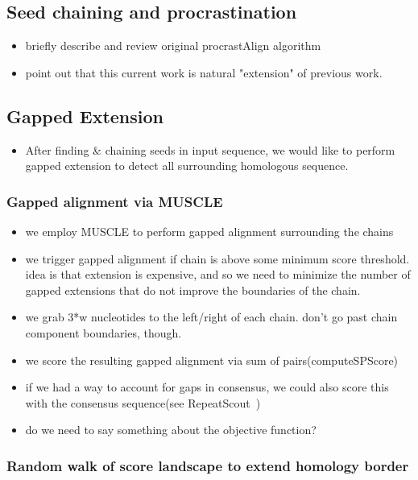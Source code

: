 \documentclass{llncs}
\begin{document}
\subsection{Seed chaining and procrastination}
\begin{itemize}
\item briefly describe and review original procrastAlign algorithm
\item point out that this current work is natural "extension" of previous work.
\end{itemize}
\subsection{Gapped Extension}
\begin{itemize}
\item After finding \& chaining seeds in input sequence, we would like to perform gapped
extension to detect all surrounding homologous sequence. 
\end{itemize}
\subsubsection{Gapped alignment via MUSCLE}
\begin{itemize}
\item we employ MUSCLE to perform gapped alignment surrounding the chains

\item we trigger gapped alignment if chain is above some minimum score threshold.
idea is that extension is expensive, and so we need to minimize the number
of gapped extensions that do not improve the boundaries of the chain.

\item we grab 3*w nucleotides to the left/right of each chain. don't go past
chain component boundaries, though. 

\item we score the resulting gapped alignment via sum of pairs(computeSPScore)
\item if we had a way to account for gaps in consensus, we could also 
score this with the consensus sequence(see RepeatScout~\cite{ref-repeatscout})
\item do we need to say something about the objective function?

\end{itemize}

\subsubsection{Random walk of score landscape to extend homology border}
\end{document}
